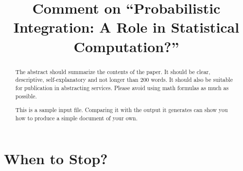 \documentclass[sts]{imsart}
\numberwithin{equation}{section}
\theoremstyle{plain}
\begin{document}
\begin{frontmatter}
\title{Comment on ``Probabilistic Integration: A Role in Statistical Computation?''
}


\begin{abstract}
The abstract should summarize the contents of the paper.
It should be clear, descriptive, self-explanatory and not longer
than 200 words. It should also be suitable for publication in
abstracting services. Please avoid using math formulas as much as possible.

This is a sample input file.  Comparing it with the output it
generates can show you how to produce a simple document of
your own.
\end{abstract}

\begin{keyword}
\kwd{\LaTeXe}
\end{keyword}

\end{frontmatter}

\section{When to Stop?}
\end{document}
